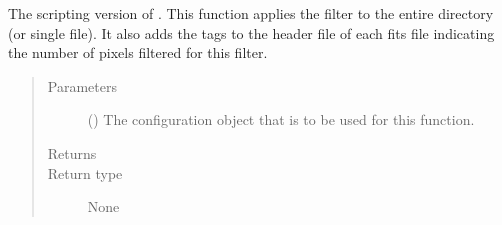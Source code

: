 \documentclass[letterpaper,10pt,english]{sphinxmanual}
\begin{document}

\begin{fulllineitems}
\label{\detokenize{docstrings/ifa_smeargle.masking.scripting:ifa_smeargle.masking.scripting.script_filter_maximum_value}}
The scripting version of . This
function applies the filter to the entire directory (or single
file). It also adds the tags to the header file of each fits file
indicating the number of pixels filtered for this filter.
\begin{quote}\begin{description}
\item[{Parameters}] \leavevmode
{} () \textendash{} The configuration object that is to be used for this
function.

\item[{Returns}] \leavevmode


\item[{Return type}] \leavevmode
None

\end{description}\end{quote}

\end{fulllineitems}

\end{document}
